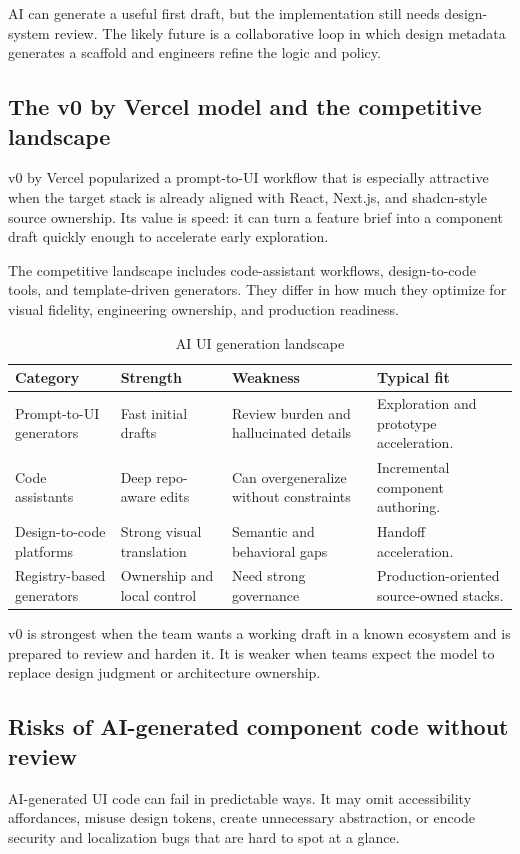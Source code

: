 AI can generate a useful first draft, but the implementation still needs design-system review. The likely future is a collaborative loop in which design metadata generates a scaffold and engineers refine the logic and policy.

\subsection{The v0 by Vercel model and the competitive landscape}
v0 by Vercel popularized a prompt-to-UI workflow that is especially attractive when the target stack is already aligned with React, Next.js, and shadcn-style source ownership. Its value is speed: it can turn a feature brief into a component draft quickly enough to accelerate early exploration.

The competitive landscape includes code-assistant workflows, design-to-code tools, and template-driven generators. They differ in how much they optimize for visual fidelity, engineering ownership, and production readiness.

\begin{table}[htbp]
  \centering
  \caption{AI UI generation landscape}
  \begin{tabularx}{\textwidth}{@{}p{}p{}p{}Y@{}}
    \toprule
    \textbf{Category} & \textbf{Strength} & \textbf{Weakness} & \textbf{Typical fit} \\
    \midrule
    Prompt-to-UI generators & Fast initial drafts & Review burden and hallucinated details & Exploration and prototype acceleration. \\
    Code assistants & Deep repo-aware edits & Can overgeneralize without constraints & Incremental component authoring. \\
    Design-to-code platforms & Strong visual translation & Semantic and behavioral gaps & Handoff acceleration. \\
    Registry-based generators & Ownership and local control & Need strong governance & Production-oriented source-owned stacks. \\
    \bottomrule
  \end{tabularx}
\end{table}

v0 is strongest when the team wants a working draft in a known ecosystem and is prepared to review and harden it. It is weaker when teams expect the model to replace design judgment or architecture ownership.

\subsection{Risks of AI-generated component code without review}
AI-generated UI code can fail in predictable ways. It may omit accessibility affordances, misuse design tokens, create unnecessary abstraction, or encode security and localization bugs that are hard to spot at a glance.

